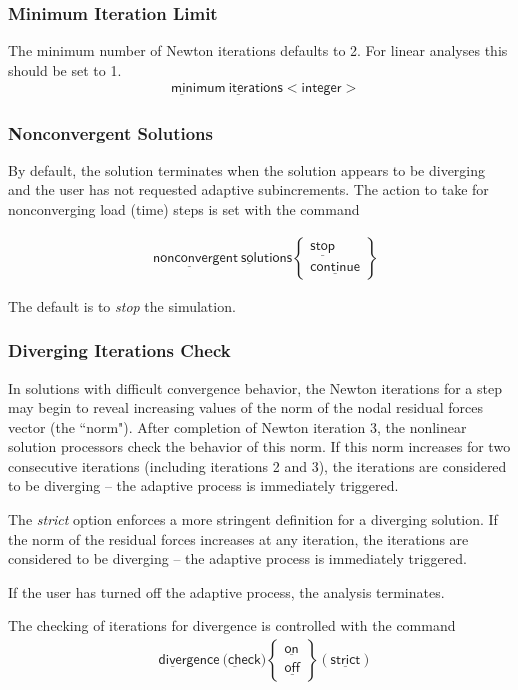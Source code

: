 \documentclass[11pt]{report}
\numberwithin{equation}{section}
\newcommand{\nin} {\noindent}
\newcommand{\ul} {\underline}
\newcommand{\hv} {\mathsf}   %
\newcommand{\ti}{\emph}
\begin{document}
\subsubsection{Minimum Iteration Limit}
\nin The minimum number of Newton iterations defaults to 2. 
 For linear analyses this should be set to 1.
 \begin{align*}
&\hv{\ul{min}imum\  \ul{iter}ations <integer> }
\end{align*}

\subsubsection{Nonconvergent Solutions}
\nin By default, the solution terminates when the solution appears to be
diverging and the user has not requested adaptive subincrements.
The action to take for nonconverging load (time) steps
is set with the command

\begin{align*}
&\hv{\ul{nonconverge}nt\  \ul{sol}utions }
\begin{Bmatrix}
\hv{\ul{stop}}\\ \hv{\ul{continue}}
\end{Bmatrix}
\end{align*}

\noindent The default is to \ti{stop} the simulation.

\subsubsection{Diverging Iterations Check}
\nin In solutions with difficult convergence behavior, the Newton iterations for a
step may begin to reveal increasing values of the norm of the nodal 
residual forces vector
(the ``norm").
After completion of Newton iteration 3, 
the nonlinear solution processors  check
the behavior of this norm. If this norm increases for two 
consecutive iterations (including iterations 2 and 3), the iterations are
considered to be diverging --  the adaptive process is
immediately triggered. 

The \ti{strict} option enforces a more stringent definition
for a diverging solution. If the norm of the residual forces increases
at any iteration, the iterations are
considered to be diverging --  the adaptive process is immediately triggered. 

If the user has turned off the adaptive process, the analysis
terminates.

The checking of iterations for divergence is controlled with the command
\begin{align*}
&\hv{\ul{diver}gence\  (\ul{ch}eck })
\begin{Bmatrix}
\hv{\ul{on}}\\ \hv{\ul{off}}
\end{Bmatrix}
\hv{(\ul{strict})}
\end{align*}
\end{document}
